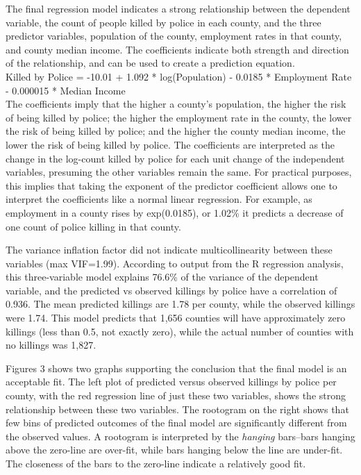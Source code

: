 \documentclass[sigconf]{acmart}
\begin{document}
The final regression model indicates a strong relationship between the dependent variable, the count of people killed by police in each county, and the three predictor variables, population of the county, employment rates in that county, and county median income.  The coefficients indicate both strength and direction of the relationship, and can be used to create a prediction equation. \\ 

Killed by Police = -10.01 + 1.092 * log(Population) - 0.0185 * Employment Rate - 0.000015 * Median Income\\

The coefficients imply that the higher a county's population, the higher the risk of being killed by police; the higher the employment rate in the county, the lower the risk of being killed by police; and the higher the county median income, the lower the risk of being killed by police.  The coefficients are interpreted as the change in the log-count killed by police for each unit change of the independent variables, presuming the other variables remain the same.  For practical purposes, this implies that taking the exponent of the predictor coefficient allows one to interpret the coefficients like a normal linear regression.  For example, as employment in a county rises by exp(0.0185), or 1.02\% it predicts a decrease of one count of police killing in that county.

The variance inflation factor did not indicate multicollinearity between these variables (max VIF=1.99). \cite{kaminski05,nix17} According to output from the R regression analysis, this three-variable model explains 76.6\% of the variance of the dependent variable, and the predicted vs observed killings by police have a correlation of 0.936.  The mean predicted killings are 1.78 per county, while the observed killings were 1.74.  This model predicts that 1,656 counties will have approximately zero killings (less than 0.5, not exactly zero), while the actual number of counties with no killings was 1,827. \cite{beaujean16}

Figures 3 shows two graphs supporting the conclusion that the final model is an acceptable fit.  The left plot of predicted versus observed killings by police per county, with the red regression line of just these two variables, shows the strong relationship between these two variables.  The rootogram on the right shows that few bins of predicted outcomes of the final model are significantly different from the observed values.  A rootogram is interpreted by the {\em hanging} bars--bars hanging above the zero-line are over-fit, while bars hanging below the line are under-fit. \cite{rootogram}  The closeness of the bars to the zero-line indicate a relatively good fit.
\end{document}

